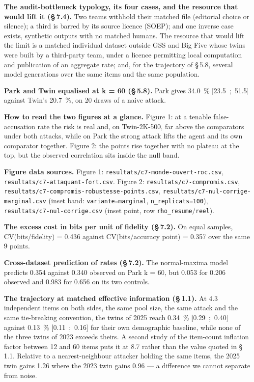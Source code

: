 \documentclass[sigconf,anonymous,review]{acmart}
\begin{document}
\textbf{The audit-bottleneck typology, its four cases, and the resource that would lift it (\S\,7.4).} Two teams withhold their matched file (editorial choice or silence); a third is barred by its source licence (SOEP); and one inverse case exists, synthetic outputs with no matched humans. The resource that would lift the limit is a matched individual dataset outside GSS and Big Five whose twins were built by a third-party team, under a licence permitting local computation and publication of an aggregate rate; and, for the trajectory of \S\,5.8, several model generations over the same items and the same population.

\textbf{Park and Twin equalised at k = 60 (\S\,5.8).} Park gives 34.0~\% [23.5~;~51.5] against Twin's 20.7~\%, on 20 draws of a naive attack.

\textbf{How to read the two figures at a glance.} Figure 1: at a tenable false-accusation rate the risk is real and, on Twin-2K-500, far above the comparators under both attacks, while on Park the strong attack lifts the agent and its own comparator together. Figure 2: the points rise together with no plateau at the top, but the observed correlation sits inside the null band.

\textbf{Figure data sources.} Figure 1: \texttt{resultats/\allowbreak{}c7-\allowbreak{}monde-\allowbreak{}ouvert-\allowbreak{}roc\allowbreak{}.csv}, \texttt{resultats/\allowbreak{}c7-\allowbreak{}attaquant-\allowbreak{}fort\allowbreak{}.csv}. Figure 2: \texttt{resultats/\allowbreak{}c7-\allowbreak{}compromis\allowbreak{}.csv}, \texttt{resultats/\allowbreak{}c7-\allowbreak{}compromis-\allowbreak{}robustesse-\allowbreak{}points\allowbreak{}.csv}, \texttt{resultats/\allowbreak{}c7-\allowbreak{}nul-\allowbreak{}corrige-\allowbreak{}marginal\allowbreak{}.csv} (inset band: \texttt{variante=marginal}, \texttt{n\_\allowbreak{}replicats=100}), \texttt{resultats/\allowbreak{}c7-\allowbreak{}nul-\allowbreak{}corrige\allowbreak{}.csv} (inset point, row \texttt{rho\_\allowbreak{}resume}/\texttt{reel}).

\textbf{The excess cost in bits per unit of fidelity (\S\,7.2).} On equal samples, CV(bits/fidelity) = 0.436 against CV(bits/accuracy point) = 0.357 over the same 9 points.

\textbf{Cross-dataset prediction of rates (\S\,7.2).} The normal-maxima model predicts 0.354 against 0.340 observed on Park k = 60, but 0.053 for 0.206 observed and 0.983 for 0.656 on its two controls.

\textbf{The trajectory at matched effective information (\S\,1.1).} At 4.3 independent items on both sides, the same pool size, the same attack and the same tie-breaking convention, the twins of 2025 reach 0.34~\% [0.29~;~0.40] against 0.13~\% [0.11~;~0.16] for their own demographic baseline, while none of the three twins of 2023 exceeds theirs. A second study of the item-count inflation factor between 12 and 60 items puts it at 8.7 rather than the value quoted in \S\,1.1. Relative to a nearest-neighbour attacker holding the same items, the 2025 twin gains 1.26 where the 2023 twin gains 0.96 --- a difference we cannot separate from noise.
\end{document}
